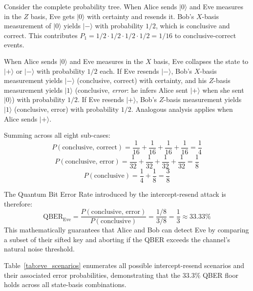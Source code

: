 \documentclass[conference]{IEEEtran}
\begin{document}
Consider the complete probability tree. When Alice sends $|0\rangle$ and Eve measures in the $Z$ basis, Eve gets $|0\rangle$ with certainty and resends it. Bob's $X$-basis measurement of $|0\rangle$ yields $|-\rangle$ with probability $1/2$, which is conclusive and correct. This contributes $P_{1} = 1/2 \cdot 1/2 \cdot 1/2 \cdot 1/2 = 1/16$ to conclusive-correct events.

When Alice sends $|0\rangle$ and Eve measures in the $X$ basis, Eve collapses the state to $|{+}\rangle$ or $|-\rangle$ with probability $1/2$ each. If Eve resends $|-\rangle$, Bob's $X$-basis measurement yields $|-\rangle$ (conclusive, correct) with certainty, and his $Z$-basis measurement yields $|1\rangle$ (conclusive, \textit{error}: he infers Alice sent $|{+}\rangle$ when she sent $|0\rangle$) with probability $1/2$. If Eve resends $|{+}\rangle$, Bob's $Z$-basis measurement yields $|1\rangle$ (conclusive, error) with probability $1/2$. Analogous analysis applies when Alice sends $|{+}\rangle$.

Summing across all eight sub-cases:
\begin{equation}
P(\text{conclusive, correct}) = \frac{1}{16}+\frac{1}{16}+\frac{1}{16}+\frac{1}{16} = \frac{1}{4}
\end{equation}
\begin{equation}
P(\text{conclusive, error}) = \frac{1}{32}+\frac{1}{32}+\frac{1}{32}+\frac{1}{32} = \frac{1}{8}
\end{equation}
\begin{equation}
P(\text{conclusive}) = \frac{1}{4} + \frac{1}{8} = \frac{3}{8}
\end{equation}

The Quantum Bit Error Rate introduced by the intercept-resend attack is therefore:
\begin{equation}
\text{QBER}_{\text{Eve}} = \frac{P(\text{conclusive, error})}{P(\text{conclusive})} = \frac{1/8}{3/8} = \frac{1}{3} \approx 33.33\%
\end{equation}
This mathematically guarantees that Alice and Bob can detect Eve by comparing a subset of their sifted key and aborting if the QBER exceeds the channel's natural noise threshold.


Table~\ref{tab:eve_scenarios} enumerates all possible intercept-resend scenarios and their associated error probabilities, demonstrating that the 33.3\% QBER floor holds across all state-basis combinations.
\end{document}
